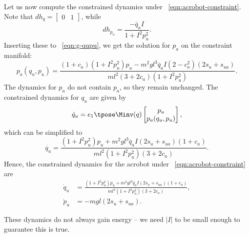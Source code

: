 Let us now compute the constrained dynamics under
~\eqref{eqn:acrobot-constraint}.
Note that \(dh_q = \begin{bmatrix}0 & 1\end{bmatrix}\), while
\[
    dh_{p_u} = \frac{-\bar{q}_a I}{1 + I^2 p_u^2}
    .
\]
Inserting these to ~\eqref{eqn:g-qupu}, we get the solution for \(p_a\) on the
constraint manifold:
\[
    p_a(q_u,p_u) = \frac{
        (1+c_a)(1+I^2 p_u^2)p_u - m^2gl^3\bar{q}_a I (2-c_a^2)(2s_u + s_{ua})
    }{ml^2(3+2c_a)(1+I^2 p_u^2)}
    .
\]
The dynamics for \(p_u\) do not contain \(p_a\), so they remain unchanged.
The constrained dynamics for \(q_u\) are given by 
\begin{equation*}
    \dot{q}_u = e_1\tpose \Minv(q) \begin{bmatrix}
                    p_u \\ p_a(q_u,p_u)
                \end{bmatrix} %
    ,
\end{equation*}
which can be simplified to 
\begin{equation*}
    \dot{q_u} = \frac{(1+I^2 p_u^2)p_u + m^2gl^3\bar{q}_a I(2s_u + s_{ua})(1+c_a) }{ml^2(1+I^2 p_u^2)(3+2c_a)}
    .
\end{equation*}
Hence, the constrained dynamics for the acrobot under
~\eqref{eqn:acrobot-constraint} are
\begin{align}\label{eqn:acrobot-constrained-dynamics}
    \dot{q}_u &= \frac{(1+I^2 p_u^2)p_u + m^2gl^3\bar{q}_a I(2s_u + s_{ua})(1+c_a) }
            {ml^2(1+I^2 p_u^2)(3+2c_a)}
        , \\
    \dot{p}_u &= - m g l (2s_u + s_{ua})
    . \nonumber
\end{align}

These dynamics do not always gain energy -- we need \(|I|\) to be small enough
to guarantee this is true.

